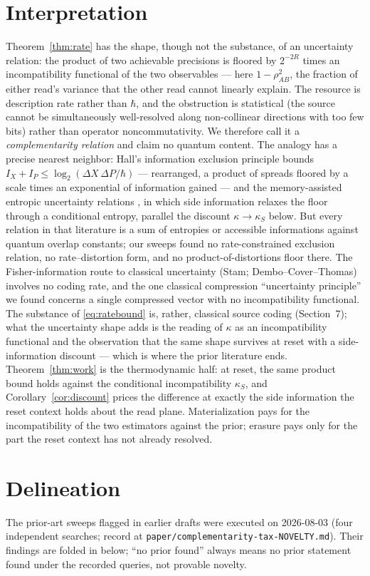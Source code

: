 \documentclass[11pt]{article}
\begin{document}
\section{Interpretation}
Theorem~\ref{thm:rate} has the shape, though not the substance, of an
uncertainty relation: the product of two achievable precisions is floored by
$2^{-2R}$ times an incompatibility functional of the two observables ---
here $1-\rho_{AB}^2$, the fraction of either read's variance that the other
read cannot linearly explain. The resource is description rate rather than
$\hbar$, and the obstruction is statistical (the source cannot be
simultaneously well-resolved along non-collinear directions with too few
bits) rather than operator noncommutativity. We therefore call it a
\emph{complementarity relation} and claim no quantum content. The analogy
has a precise nearest neighbor: Hall's information exclusion principle
\cite{hall1995} bounds $I_X+I_P\le\log_2(\Delta X\,\Delta P/\hbar)$ ---
rearranged, a product of spreads floored by a scale times an exponential of
information gained --- and the memory-assisted entropic uncertainty
relations \cite{berta2010}, in which side information relaxes the floor
through a conditional entropy, parallel the discount $\kappa\to\kappa_S$
below. But every relation in that literature is a sum of entropies or
accessible informations against quantum overlap constants; our sweeps found
no rate-constrained exclusion relation, no rate--distortion form, and no
product-of-distortions floor there. The Fisher-information route to
classical uncertainty (Stam; Dembo--Cover--Thomas) involves no coding rate,
and the one classical compression ``uncertainty principle'' we found
\cite{safaryan2021} concerns a single compressed vector with no
incompatibility functional. The substance of \eqref{eq:ratebound} is,
rather, classical source coding (Section~7); what the uncertainty shape adds
is the reading of $\kappa$ as an incompatibility functional and the
observation that the same shape survives at reset with a side-information
discount --- which is where the prior literature ends.
Theorem~\ref{thm:work} is the thermodynamic half: at reset, the same product
bound holds against the conditional incompatibility $\kappa_S$, and
Corollary~\ref{cor:discount} prices the difference at exactly the side
information the reset context holds about the read plane. Materialization
pays for the incompatibility of the two estimators against the prior;
erasure pays only for
the part the reset context has not already resolved.

\section{Delineation}\label{sec:delineation}
The prior-art sweeps flagged in earlier drafts were executed on 2026-08-03
(four independent searches; record at
\texttt{paper/complementarity-tax-NOVELTY.md}). Their findings are folded
in below; ``no prior found'' always means no prior statement found under the
recorded queries, not provable novelty.
\end{document}
